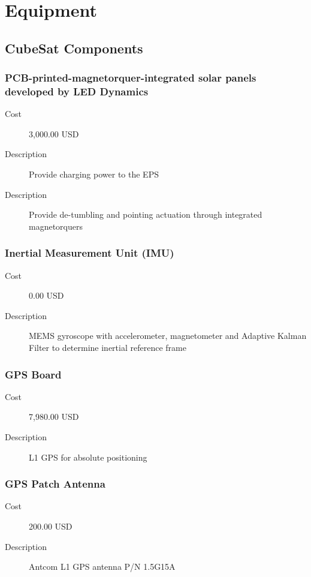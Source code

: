\section{Equipment}

\subsection{CubeSat Components}
\subsubsection{PCB-printed-magnetorquer-integrated solar panels developed by LED Dynamics}
\begin{description}
\item[Cost] 3,000.00 USD
\item[Description] Provide charging power to the EPS
\item[Description] Provide de-tumbling and pointing actuation through
  integrated magnetorquers
\end{description}

\subsubsection{Inertial Measurement Unit (IMU)}
\begin{description}
\item[Cost] 0.00 USD
\item[Description] MEMS gyroscope with accelerometer, magnetometer and
  Adaptive Kalman Filter to determine inertial reference frame
\end{description}

\subsubsection{GPS Board}
\begin{description}
\item[Cost] 7,980.00 USD
\item[Description] L1 GPS for absolute positioning
\end{description}

\subsubsection{GPS Patch Antenna}
\begin{description}
\item[Cost] 200.00 USD
\item[Description] Antcom L1 GPS antenna P/N 1.5G15A
\end{description}

